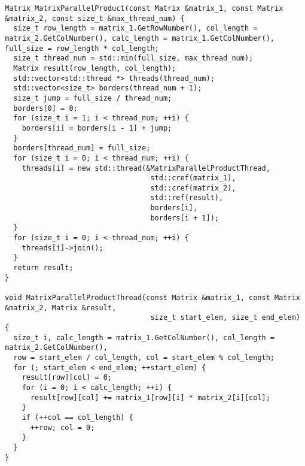 \documentclass{report}
\begin{document}
\begin{lstlisting}
Matrix MatrixParallelProduct(const Matrix &matrix_1, const Matrix &matrix_2, const size_t &max_thread_num) {
  size_t row_length = matrix_1.GetRowNumber(), col_length = matrix_2.GetColNumber(), calc_length = matrix_1.GetColNumber(), full_size = row_length * col_length;
  size_t thread_num = std::min(full_size, max_thread_num);
  Matrix result(row_length, col_length);
  std::vector<std::thread *> threads(thread_num);
  std::vector<size_t> borders(thread_num + 1);
  size_t jump = full_size / thread_num;
  borders[0] = 0;
  for (size_t i = 1; i < thread_num; ++i) {
    borders[i] = borders[i - 1] + jump;
  }
  borders[thread_num] = full_size;
  for (size_t i = 0; i < thread_num; ++i) {
    threads[i] = new std::thread(&MatrixParallelProductThread,
                                  std::cref(matrix_1),
                                  std::cref(matrix_2),
                                  std::ref(result),
                                  borders[i],
                                  borders[i + 1]);
  }
  for (size_t i = 0; i < thread_num; ++i) {
    threads[i]->join();
  }
  return result;
}

void MatrixParallelProductThread(const Matrix &matrix_1, const Matrix &matrix_2, Matrix &result,
                                  size_t start_elem, size_t end_elem) {
  size_t i, calc_length = matrix_1.GetColNumber(), col_length = matrix_2.GetColNumber(),
  row = start_elem / col_length, col = start_elem % col_length;
  for (; start_elem < end_elem; ++start_elem) {
    result[row][col] = 0;
    for (i = 0; i < calc_length; ++i) {
      result[row][col] += matrix_1[row][i] * matrix_2[i][col];
    }
    if (++col == col_length) {
      ++row; col = 0;
    }
  }
}  
\end{lstlisting}
\end{document}
